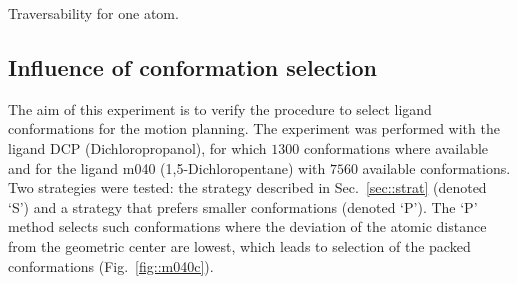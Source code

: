 \documentclass[usletter, 10pt, conference]{ieeeconf} %
\def\LA{L_1}
\def\LB{L_2}
\begin{document}
\begin{table}
\centering
\caption{\label{tab::one}Traversability for one atom.}
\renewcommand{\tabcolsep}{3.5pt}
{\small

}
\end{table}


%
%





%

\subsection{Influence of conformation selection}

The aim of this experiment is to verify the procedure to select ligand conformations for the motion planning.
The experiment was performed with the ligand DCP (Dichloropropanol), for which $1300$ conformations where available and for the ligand
m040 (1,5-Dichloropentane) with $7560$ available conformations.
Two strategies were tested: the strategy described in Sec.~\ref{sec::strat} (denoted `S') and a strategy that prefers smaller conformations (denoted `P').
The `P' method selects such conformations where the deviation of the atomic distance from the geometric center are lowest, which leads 
to selection of the packed conformations (Fig.~\ref{fig::m040c}).
\end{document}
